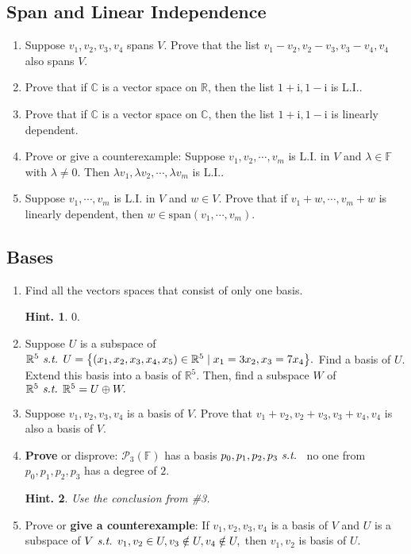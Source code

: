 \documentclass[11pt, letterpaper]{article}
\newtheorem*{hint}{Hint.}
\def\R{\mathbb{R}}
\def\C{\mathbb{C}}
\def\F{\mathbb{F}}
\def\i{\mathrm{i}}
\def\P{\mathcal{P}}
\def\st{\emph{ s.t. }}
\def\LI{\mathrm{L.I.}}
\def\span{\mathrm{span}}
\begin{document}
\subsection{Span and Linear Independence}
\begin{enumerate}
	\item Suppose $v_1,v_2,v_3,v_4$ spans $V$. Prove that the list $v_1-v_2,v_2-v_3,v_3-v_4,v_4$ also spans $V$.
	\item Prove that if $\C$ is a vector space on $\R$, then the list $1+\i,1-\i$ is $\LI$. 
	\item Prove that if $\C$ is a vector space on $\C$, then the list $1+\i,1-\i$ is linearly dependent.
	\item Prove or give a counterexample: Suppose $v_1,v_2,\cdots,v_m$ is $\LI$ in $V$ and $\lambda\in\F$ with $\lambda\neq0.$ Then $\lambda v_1,\lambda v_2,\cdots,\lambda v_m$ is $\LI$.
	\item Suppose $v_1,\cdots,v_m$ is $\LI$ in $V$ and $w\in V$. Prove that if $v_1+w,\cdots,v_m+w$ is linearly dependent, then $w\in\span(v_1,\cdots,v_m).$
\end{enumerate}
\subsection{Bases}
\begin{enumerate}
	\item Find all the vectors spaces that consist of only one basis. \begin{hint}$\qty{0}.$\end{hint}
	\item Suppose $U$ is a subspace of $\R^5\st U=\qty{(x_1,x_2,x_3,x_4,x_5)\in\R^5\mid x_1=3x_2,x_3=7x_4}.$ Find a basis of $U$. Extend this basis into a basis of $\R^5.$ Then, find a subspace $W$ of $\R^5\st\R^5=U\oplus W.$
	\item Suppose $v_1,v_2,v_3,v_4$ is a basis of $V$. Prove that $v_1+v_2,v_2+v_3,v_3+v_4,v_4$ is also a basis of $V$.
	\item \textbf{Prove} or disprove: $\P_3(\F)$ has a basis $p_0,p_1,p_2,p_3\st$ no one from $p_0,p_1,p_2,p_3$ has a degree of $2$. \begin{hint}Use the conclusion from \#3.\end{hint}
	\item Prove or \textbf{give a counterexample}: If $v_1,v_2,v_3,v_4$ is a basis of $V$ and $U$ is a subspace of $V\st v_1,v_2\in U,v_3\notin U,v_4\notin U,$ then $v_1,v_2$ is basis of $U$.
\end{enumerate}
\end{document}
